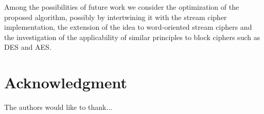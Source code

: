 \documentclass[conference]{IEEEtran}
\begin{document}
Among the possibilities of future work we consider the optimization of the proposed algorithm, possibly by intertwining it with the stream cipher implementation, the extension of the idea to word-oriented stream ciphers and the investigation of the applicability of similar principles to block ciphers such as DES and AES.




\section*{Acknowledgment}


The authors would like to thank...







%
%
%




\end{document}
